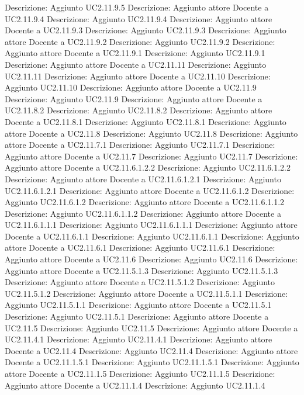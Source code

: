 Descrizione: Aggiunto UC2.11.9.5 
Descrizione: Aggiunto attore Docente a UC2.11.9.4 
Descrizione: Aggiunto UC2.11.9.4 
Descrizione: Aggiunto attore Docente a UC2.11.9.3 
Descrizione: Aggiunto UC2.11.9.3 
Descrizione: Aggiunto attore Docente a UC2.11.9.2 
Descrizione: Aggiunto UC2.11.9.2 
Descrizione: Aggiunto attore Docente a UC2.11.9.1 
Descrizione: Aggiunto UC2.11.9.1 
Descrizione: Aggiunto attore Docente a UC2.11.11 
Descrizione: Aggiunto UC2.11.11 
Descrizione: Aggiunto attore Docente a UC2.11.10 
Descrizione: Aggiunto UC2.11.10 
Descrizione: Aggiunto attore Docente a UC2.11.9 
Descrizione: Aggiunto UC2.11.9 
Descrizione: Aggiunto attore Docente a UC2.11.8.2 
Descrizione: Aggiunto UC2.11.8.2 
Descrizione: Aggiunto attore Docente a UC2.11.8.1 
Descrizione: Aggiunto UC2.11.8.1 
Descrizione: Aggiunto attore Docente a UC2.11.8 
Descrizione: Aggiunto UC2.11.8 
Descrizione: Aggiunto attore Docente a UC2.11.7.1 
Descrizione: Aggiunto UC2.11.7.1 
Descrizione: Aggiunto attore Docente a UC2.11.7 
Descrizione: Aggiunto UC2.11.7 
Descrizione: Aggiunto attore Docente a UC2.11.6.1.2.2 
Descrizione: Aggiunto UC2.11.6.1.2.2 
Descrizione: Aggiunto attore Docente a UC2.11.6.1.2.1 
Descrizione: Aggiunto UC2.11.6.1.2.1 
Descrizione: Aggiunto attore Docente a UC2.11.6.1.2 
Descrizione: Aggiunto UC2.11.6.1.2 
Descrizione: Aggiunto attore Docente a UC2.11.6.1.1.2 
Descrizione: Aggiunto UC2.11.6.1.1.2 
Descrizione: Aggiunto attore Docente a UC2.11.6.1.1.1 
Descrizione: Aggiunto UC2.11.6.1.1.1 
Descrizione: Aggiunto attore Docente a UC2.11.6.1.1 
Descrizione: Aggiunto UC2.11.6.1.1 
Descrizione: Aggiunto attore Docente a UC2.11.6.1 
Descrizione: Aggiunto UC2.11.6.1 
Descrizione: Aggiunto attore Docente a UC2.11.6 
Descrizione: Aggiunto UC2.11.6 
Descrizione: Aggiunto attore Docente a UC2.11.5.1.3 
Descrizione: Aggiunto UC2.11.5.1.3 
Descrizione: Aggiunto attore Docente a UC2.11.5.1.2 
Descrizione: Aggiunto UC2.11.5.1.2 
Descrizione: Aggiunto attore Docente a UC2.11.5.1.1 
Descrizione: Aggiunto UC2.11.5.1.1 
Descrizione: Aggiunto attore Docente a UC2.11.5.1 
Descrizione: Aggiunto UC2.11.5.1 
Descrizione: Aggiunto attore Docente a UC2.11.5 
Descrizione: Aggiunto UC2.11.5 
Descrizione: Aggiunto attore Docente a UC2.11.4.1 
Descrizione: Aggiunto UC2.11.4.1 
Descrizione: Aggiunto attore Docente a UC2.11.4 
Descrizione: Aggiunto UC2.11.4 
Descrizione: Aggiunto attore Docente a UC2.11.1.5.1 
Descrizione: Aggiunto UC2.11.1.5.1 
Descrizione: Aggiunto attore Docente a UC2.11.1.5 
Descrizione: Aggiunto UC2.11.1.5 
Descrizione: Aggiunto attore Docente a UC2.11.1.4 
Descrizione: Aggiunto UC2.11.1.4 
